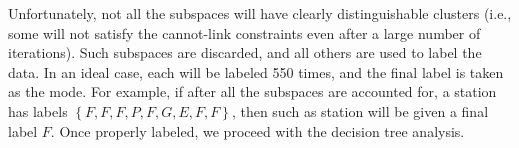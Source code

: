 Unfortunately, not all the subspaces will have clearly distinguishable clusters (i.e., some will not satisfy the cannot-link constraints even after a large number of iterations). Such subspaces are discarded, and all others are used to label the data. In an ideal case, each  will be labeled 550 times, and the final label is taken as the mode. For example, if after all the subspaces are accounted for, a station has labels $\left\{F, F, F, P, F, G, E, F, F\right\}$, then such as station will be given a final label $F$. Once  properly labeled, we proceed with the decision tree analysis.
